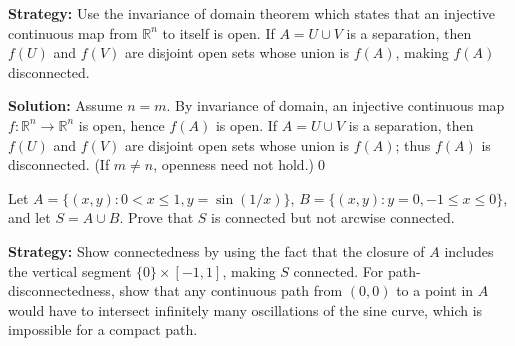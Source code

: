 \noindent\textbf{Strategy:} Use the invariance of domain theorem which states that an injective continuous map from $\mathbb{R}^n$ to itself is open. If $A = U \cup V$ is a separation, then $f(U)$ and $f(V)$ are disjoint open sets whose union is $f(A)$, making $f(A)$ disconnected.

\bigskip\noindent\textbf{Solution:}
Assume $n=m$. By invariance of domain, an injective continuous map $f:\mathbb{R}^n\to\mathbb{R}^n$ is open, hence $f(A)$ is open. If $A=U\cup V$ is a separation, then $f(U)$ and $f(V)$ are disjoint open sets whose union is $f(A)$; thus $f(A)$ is disconnected. (If $m\ne n$, openness need not hold.)\qed



\begin{problembox}
\begin{problemstatement}
Let $A = \{(x, y) : 0 < x \leq 1, y = \sin(1/x)\}$, $B = \{(x, y) : y = 0, -1 \leq x \leq 0\}$, and let $S = A \cup B$. Prove that $S$ is connected but not arcwise connected.
\end{problemstatement}
\end{problembox}

\noindent\textbf{Strategy:} Show connectedness by using the fact that the closure of $A$ includes the vertical segment $\{0\} \times [-1,1]$, making $S$ connected. For path-disconnectedness, show that any continuous path from $(0,0)$ to a point in $A$ would have to intersect infinitely many oscillations of the sine curve, which is impossible for a compact path.


